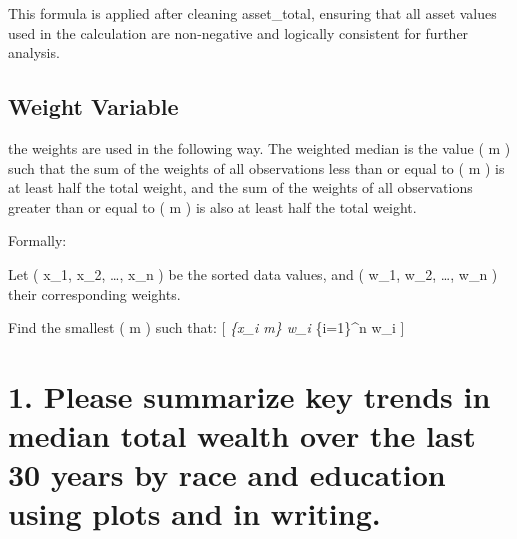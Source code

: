 \documentclass[
  letterpaper,
  DIV=11,
  numbers=noendperiod]{scrartcl}
\begin{document}
This formula is applied after cleaning asset\_total, ensuring that all
asset values used in the calculation are non-negative and logically
consistent for further analysis.

\subsection{Weight Variable}\label{weight-variable}

the weights are used in the following way. The weighted median is the
value ( m ) such that the sum of the weights of all observations less
than or equal to ( m ) is at least half the total weight, and the sum of
the weights of all observations greater than or equal to ( m ) is also
at least half the total weight.

Formally:

Let ( x\_1, x\_2, \ldots, x\_n ) be the sorted data values, and ( w\_1,
w\_2, \ldots, w\_n ) their corresponding weights.

Find the smallest ( m ) such that: {[} \sum\emph{\{x\_i \leq m\} w\_i
\geq {} \sum}\{i=1\}\^{}n w\_i {]}

\section{1. Please summarize key trends in median total wealth over the
last 30 years by race and education using plots and in
writing.}\label{please-summarize-key-trends-in-median-total-wealth-over-the-last-30-years-by-race-and-education-using-plots-and-in-writing.}
\end{document}
